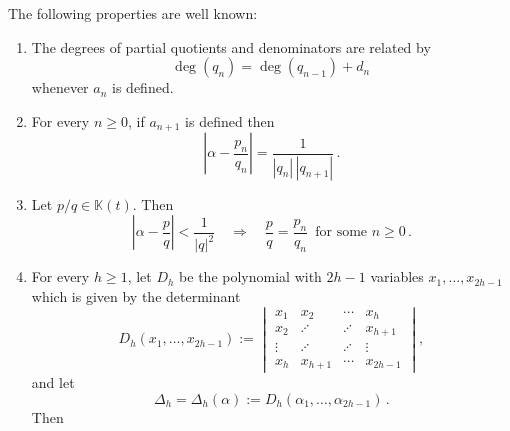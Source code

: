 \documentclass[a4paper,12pt]{article}
\def\fq{\bbk}
\def\ftt{\fq(t)}
\def\defeq{:=}
\def\bbk{\mathbb{K}}
\def\defeq{:=}
\newcommand{\HankelPolynomial}{D}
\newcommand{\HankelDeterminant}{\Delta}
\newcommand {\ignore}[1]  {}
\begin{document}
The following properties are well known:
\begin{enumerate}
\item The degrees of partial quotients and denominators are related by 
\begin{equation}\label{eq:common1}
\deg(q_n)=\deg(q_{n-1}) + d_n\,
\end{equation}
whenever $a_n$ is defined.
\item For every $n\geq0$, if $a_{n+1}$ is defined then 
\begin{equation}\label{eq:common3}
\left|\alpha-\frac{p_n}{q_n} \right|=\frac{1}{|q_n|\,|q_{n+1}|}\,.
\end{equation}
\item Let $p/q\in\ftt$. Then
\begin{equation}\label{eq:common4}
    \left|\alpha-\frac{p}{q} \right|<\frac{1}{|q|^2} \quad\Longrightarrow\quad \frac pq=\frac {p_n}{q_n}\,\textrm{ for some $n\geq0$}\,. 
\end{equation}
\ignore{\item
\begin{equation}\label{eq:common5}
    \frac{q_n}{q_{n-1}} = [a_n;a_{n-1},\ldots,a_{1}]\,.
\end{equation}}
\item For every $h\geq1$, let $\HankelPolynomial_h$ be the polynomial with $2h-1$ variables $x_1,\ldots,x_{2h-1}$ which is given by the determinant
\begin{equation}\label{eq:tm_hankel}
	\HankelPolynomial_h(x_1,\ldots,x_{2h-1}) \defeq 
	\begin{vmatrix}
		x_{1}&x_{2}&\cdots &x_{h}\\
		x_{2}&\iddots&\iddots&x_{h+1}\\
		\vdots&\iddots&\iddots&\vdots\\
		x_{h}&x_{h+1}&\cdots&x_{2h-1}
	\end{vmatrix},
\end{equation}
and let
\begin{equation*}
\HankelDeterminant_h=\HankelDeterminant_h(\alpha)\defeq\HankelPolynomial_h(\alpha_1,\ldots,\alpha_{2h-1})\,.
\end{equation*}
Then
\begin{equation}\label{eq:det_lem}

\end{equation}
\end{enumerate}
\end{document}
